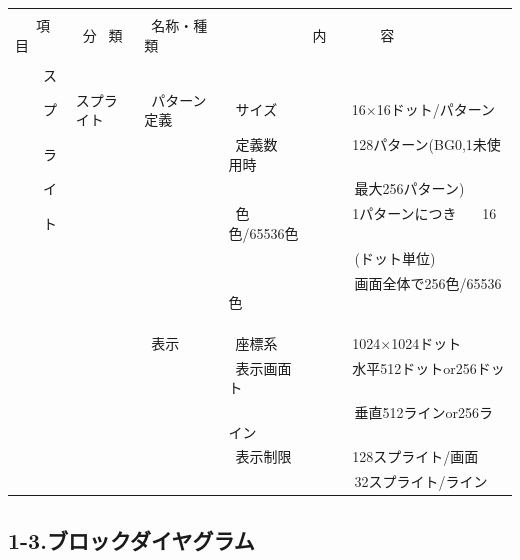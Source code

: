 \documentclass[twoside,a4paper,12pt]{article}
\begin{document}
\begin{tabular}{|p{17mm}|p{20mm}|p{27mm}|p{100mm}|}
\hline
& & &\\
\ \ \ 項目 & \ 分 \ 類 & \ 名称・種類 & \ \ \ \ \ \ \ \ \ \ \ \ 内 \ \ \ \ \ \ \ 容\\[1mm]
\hline
& & &\\[-3mm]
\ \ \ \ ス & & &\\[3mm]
\ \ \ \ プ & スプライト & \ パターン定義 & \ サイズ \ \ \ \ \ \ \ \ \ \ 16×16ドット/パターン\\[3mm]
\ \ \ \ ラ & & & \ 定義数 \ \ \ \ \ \ \ \ \ \ 128パターン(BG0,1未使用時\\[3mm]
\ \ \ \ イ & & & \ \ \ \ \ \ \ \ \ \ \ \ \ \ \ \ \ \ 最大256パターン)\\[3mm]
\ \ \ \ ト & & & \ 色 \ \ \ \ \ \ \ \ \ \ \ \ \ \ 1パターンにつき \ \ \ 16色/65536色\\[3mm]
& & & \ \ \ \ \ \ \ \ \ \ \ \ \ \ \ \ \ \ (ドット単位)\\[3mm]
& & & \ \ \ \ \ \ \ \ \ \ \ \ \ \ \ \ \ \ 画面全体で256色/65536色\\
& & &\\
& & &\\
\cline{3-4}
& & &\\[-2mm]
& & \ 表示 & \ 座標系 \ \ \ \ \ \ \ \ \ \ 1024×1024ドット\\[3mm]
& & & \ 表示画面 \ \ \ \ \ \ \ \ 水平512ドットor256ドット\\[3mm]
& & & \ \ \ \ \ \ \ \ \ \ \ \ \ \ \ \ \ \ 垂直512ラインor256ライン\\[3mm]
& & & \ 表示制限 \ \ \ \ \ \ \ \ 128スプライト/画面\\[3mm]
& & & \ \ \ \ \ \ \ \ \ \ \ \ \ \ \ \ \ \ 32スプライト/ライン\\
\hline
\end{tabular}

\newpage

\subsection*{1-3.ブロックダイヤグラム}
\end{document}
